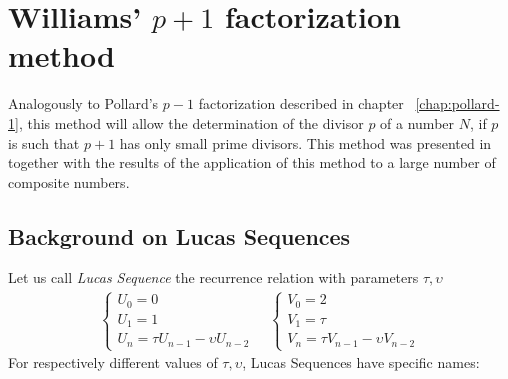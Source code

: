 \chapter{Williams' $p+1$ factorization method \label{chap:william+1}}

Analogously to Pollard's $p-1$ factorization described in chapter
~\ref{chap:pollard-1}, this method will allow the determination of the divisor
$p$ of a number $N$, if $p$ is such that $p+1$ has only small prime divisors.
This method was presented in ~\cite{Williams:p+1} together with the results of
the application of this method to a large number of composite numbers.

\section{Background on Lucas Sequences}

Let us call \emph{Lucas Sequence} the recurrence relation with parameters $\tau,
\upsilon$
\begin{align*}
  \begin{cases}
    U_0 = 0 \\
    U_1 = 1 \\
    U_n = \tau U_{n-1} - \upsilon U_{n-2}
  \end{cases}
  \quad
  \begin{cases}
    V_0 = 2 \\
    V_1 = \tau \\
    V_n = \tau V_{n-1} - \upsilon V_{n-2}
  \end{cases}
\end{align*}
For respectively different values of $\tau, \upsilon$, Lucas Sequences have
specific names:

